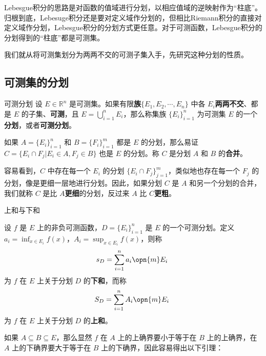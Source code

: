 

Lebesgue积分的思路是对函数的值域进行分划，以相应值域的逆映射作为“柱底”。归根到底，Lebesuge积分还是要对定义域作分划的，但相比Riemann积分的直接对定义域作分划，Lebesgue积分的分划方式更任意。对于可测函数，Lebesgue积分的分划得到的“柱底”都是可测集。

我们就从将可测集划分为两两不交的可测子集入手，先研究这种分划的性质。

\subsection{可测集的分划}



\begin{definition}{可测分划}
设 $E\in\mathbb{R}^n$ 是可测集。如果有限\textbf{族}$\{E_1, E_2, \cdots, E_n\}$ 中各 $E_i$\textbf{两两不交}、都是 $E$ 的子集、\textbf{可测}，且 $E=\bigcup^n_{i=1}E_i$，那么称集族 $\{E_i\}_{i=1}^n$ 为可测集 $E$ 的一个\textbf{分划}，或者\textbf{可测分划}。
\end{definition}

如果 $A=\{E_i\}_{i=1}^n$ 和 $B=\{F_i\}_{i=1}^m$ 都是 $E$ 的分划，那么易证 $C=\{E_i\cap F_j|E_i\in A, F_j\in B\}$ 也是 $E$ 的分划。称 $C$ 是分划 $A$ 和 $B$ 的\textbf{合并}。

容易看到，$C$ 中存在每一个 $E_i$ 的分划 $\{E_i\cap F_j\}_{j=1}^m$，类似地也存在每一个 $F_j$ 的分划，像是更细一层地进行分划。因此，如果分划 $C$ 是 $A$ 和另一个分划的合并，我们就称 $C$ 是比 $A$\textbf{更细}的分划，反过来 $A$ 比 $C$\textbf{更粗}。

\begin{definition}{上和与下和}

设 $f$ 是 $E$ 上的非负可测函数，$D=\{E_i\}_{i=1}^n$ 是 $E$ 的一个可测分划。定义 $a_i=\inf_{x\in E_i}f(x)$，$A_i=\sup_{x\in E_i}f(x)$，则称
\begin{equation}
s_D=\sum_{i=1}^n a_i \opn{m}E_i~
\end{equation}
为 $f$ 在 $E$ 上关于分划 $D$ 的\textbf{下和}，而称
\begin{equation}
S_D=\sum_{i=1}^n A_i \opn{m}E_i~
\end{equation}
为 $f$ 在 $E$ 上关于分划 $D$ 的\textbf{上和}。

\end{definition}

如果 $A\subseteq B\subseteq E$，那么显然 $f$ 在 $A$ 上的上确界要小于等于在 $B$ 上的上确界，在 $A$ 上的下确界要大于等于在 $B$ 上的下确界，因此容易得出以下引理：

